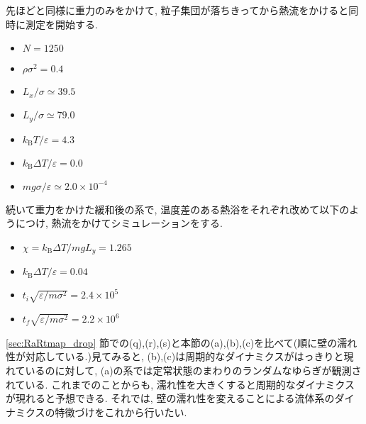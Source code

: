先ほどと同様に重力のみをかけて, 粒子集団が落ちきってから熱流をかけると同時に測定を開始する.

\begin{itemize}
  \item $N = 1250$
  \item $\rho \sigma^2 = 0.4$
  \item $L_x / \sigma \simeq 39.5$
  \item $L_y / \sigma \simeq 79.0$
  \item $k_{\text{B}} T/\varepsilon = 4.3$
  \item $k_{\text{B}} \Delta T/\varepsilon = 0.0$
  \item $mg\sigma/\varepsilon \simeq 2.0 \times 10^{-4}$
\end{itemize}

続いて重力をかけた緩和後の系で, 温度差のある熱浴をそれぞれ改めて以下のようにつけ, 熱流をかけてシミュレーションをする. 

\begin{itemize}
  \item $\chi = k_{\text{B}}\Delta T / mg L_y = 1.265$
  \item $k_{\text{B}} \Delta T/\varepsilon = 0.04$
  \item $t_i \sqrt{\varepsilon / m \sigma^2} = 2.4 \times 10^{5}$
  \item $t_f \sqrt{\varepsilon / m \sigma^2} = 2.2 \times 10^{6}$
\end{itemize}

\ref{sec:RaRtmap_drop} 節での(q),(r),(s)と本節の(a),(b),(c)を比べて(順に壁の濡れ性が対応している.)見てみると, (b),(c)は周期的なダイナミクスがはっきりと現れているのに対して, (a)の系では定常状態のまわりのランダムなゆらぎが観測されている. これまでのことからも, 濡れ性を大きくすると周期的なダイナミクスが現れると予想できる. それでは, 壁の濡れ性を変えることによる流体系のダイナミクスの特徴づけをこれから行いたい. 

